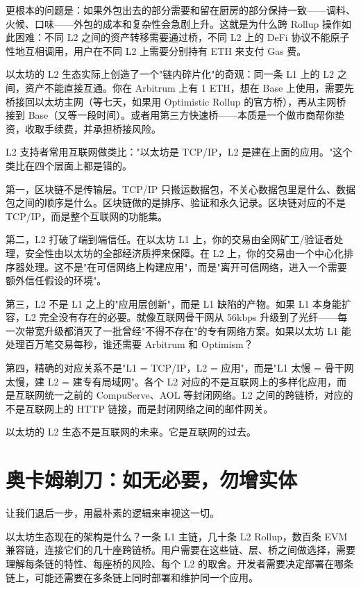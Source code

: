 \documentclass[a4paper,12pt,openany]{ctexbook}
\begin{document}
更根本的问题是：如果外包出去的部分需要和留在厨房的部分保持一致——调料、火候、口味——外包的成本和复杂性会急剧上升。这就是为什么跨 Rollup 操作如此困难：不同 L2 之间的资产转移需要通过桥，不同 L2 上的 DeFi 协议不能原子性地互相调用，用户在不同 L2 上需要分别持有 ETH 来支付 Gas 费。

以太坊的 L2 生态实际上创造了一个"链内碎片化"的奇观：同一条 L1 上的 L2 之间，资产不能直接互通。你在 Arbitrum 上有 1 ETH，想在 Base 上使用，需要先桥接回以太坊主网（等七天，如果用 Optimistic Rollup 的官方桥），再从主网桥接到 Base（又等一段时间）。或者用第三方快速桥——本质是一个做市商帮你垫资，收取手续费，并承担桥接风险。

L2 支持者常用互联网做类比："以太坊是 TCP/IP，L2 是建在上面的应用。"这个类比在四个层面上都是错的。

第一，区块链不是传输层。TCP/IP 只搬运数据包，不关心数据包里是什么、数据包之间的顺序是什么。区块链做的是排序、验证和永久记录。区块链对应的不是 TCP/IP，而是整个互联网的功能集。

第二，L2 打破了端到端信任。在以太坊 L1 上，你的交易由全网矿工/验证者处理，安全性由以太坊的全部经济质押来保障。在 L2 上，你的交易由一个中心化排序器处理。这不是"在可信网络上构建应用"，而是"离开可信网络，进入一个需要额外信任假设的环境"。

第三，L2 不是 L1 之上的"应用层创新"，而是 L1 缺陷的产物。如果 L1 本身能扩容，L2 完全没有存在的必要。就像互联网骨干网从 56kbps 升级到了光纤——每一次带宽升级都消灭了一批曾经"不得不存在"的专有网络方案。如果以太坊 L1 能处理百万笔交易每秒，谁还需要 Arbitrum 和 Optimism？

第四，精确的对应关系不是"L1 = TCP/IP，L2 = 应用"，而是"L1 太慢 = 骨干网太慢，建 L2 = 建专有局域网"。各个 L2 对应的不是互联网上的多样化应用，而是互联网统一之前的 CompuServe、AOL 等封闭网络。L2 之间的跨链桥，对应的不是互联网上的 HTTP 链接，而是封闭网络之间的邮件网关。

以太坊的 L2 生态不是互联网的未来。它是互联网的过去。


\section*{奥卡姆剃刀：如无必要，勿增实体}


让我们退后一步，用最朴素的逻辑来审视这一切。

以太坊生态现在的架构是什么？一条 L1 主链，几十条 L2 Rollup，数百条 EVM 兼容链，连接它们的几十座跨链桥。用户需要在这些链、层、桥之间做选择，需要理解每条链的特性、每座桥的风险、每个 L2 的取舍。开发者需要决定部署在哪条链上，可能还需要在多条链上同时部署和维护同一个应用。
\end{document}
